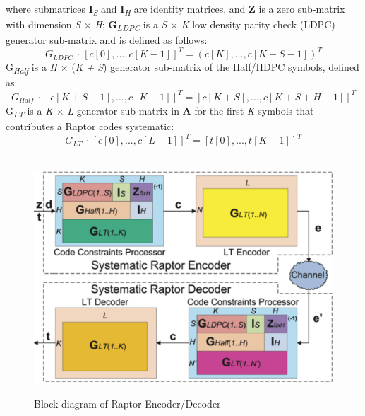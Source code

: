 where submatrices \textbf{I}\textsubscript{\textit{S}} and \textbf{I}\textsubscript{\textit{H}} are identity matrices, and \textbf{Z} is a zero sub-matrix with dimension \textit{S} $\times$ \textit{H}; \textbf{G}\textsubscript{\textit{LDPC}} is a \textit{S} $\times$ \textit{K} low density parity check (LDPC) generator sub-matrix and is defined as follows:
\begin{equation}
G_{\textit{LDPC}}{\,\cdot\,}[c[0], . . . ,c[K-1]]^{T} =  (c[K], . . . ,c[K+S-1])^{T}
\end{equation}
G\textsubscript{\textit{Half}} is a  \textit{H} $\times$ (\textit{K + S}) generator sub-matrix of the Half/HDPC symbols, defined as:
\begin{equation}
G_{\textit{Half}}{\,\cdot\,}[c[K + S - 1], . . . ,c[K - 1]]^{T} =  [c[K + S], . . . ,c[K + S + H - 1]]^{T}
\end{equation}
G\textsubscript{\textit{LT}} is a \textit{K} $\times$ \textit{L} generator sub-matrix in \textbf{A} for the first \textit{K} symbols that contributes a Raptor codes systematic:
\begin{equation}
G_{\textit{LT}}{\,\cdot\,}[c[0], . . . ,c[L - 1]]^{T} =  [t[0], . . . ,t[K - 1]]^{T}
\end{equation}

\begin{figure}[htbp]
\begin{center}
\mbox{
\includegraphics[width=5.5in]{Figures/encoder}}
\caption{Block diagram of Raptor Encoder/Decoder \cite{mladenov2011implementation}}
\label{Raptor_en_dc}
\end{center}
\end{figure}

